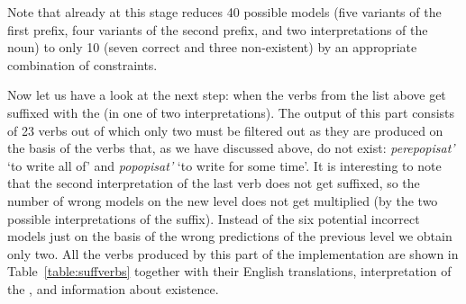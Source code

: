 Note that already at this stage  reduces 40 possible models (five variants of the first prefix, four variants of the second prefix, and two interpretations of the noun) to only 10 (seven correct and three non-existent) by an appropriate combination of constraints. 

Now let us have a look at the next step: when the verbs from the list above get suffixed with the  (in one of two interpretations). The output of this part consists of 23 verbs out of which only two must be filtered out as they are produced on the basis of the verbs that, as we have discussed above, do not exist: \textit{perepopisat'} `to write all of' and \textit{popopisat'} `to write for some time'. It is interesting to note that the second interpretation of the last verb does not get suffixed, so the number of wrong models on the new level does not get multiplied (by the two possible interpretations of the suffix). Instead of the six potential incorrect models just on the basis of the wrong predictions of the previous level we obtain only two. All the verbs produced by this part of the implementation are shown in Table~\ref{table:suffverbs} together with their English translations, interpretation of the , and information about existence.\largerpage


